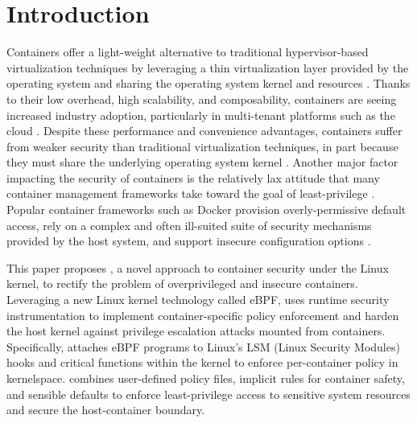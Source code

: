 \section{Introduction}

Containers offer a light-weight alternative to traditional hypervisor-based virtualization techniques by leveraging a thin virtualization layer provided by the operating system and sharing the operating system kernel and resources \cite{sultan2019_container_security,sun2018_security_namespace}. Thanks to their low overhead, high scalability, and composability, containers are seeing increased industry adoption, particularly in multi-tenant platforms such as the cloud \cite{sultan2019_container_security}. Despite these performance and convenience advantages, containers suffer from weaker security than traditional virtualization techniques, in part because they must share the underlying operating system kernel \cite{sultan2019_container_security,sun2018_security_namespace,xin2018_container_security}. Another major factor impacting the security of containers is the relatively lax attitude that many container management frameworks take toward the goal of least-privilege \cite{sultan2019_container_security}. Popular container frameworks such as Docker \cite{docker} provision overly-permissive default access, rely on a complex and often ill-suited suite of security mechanisms provided by the host system, and support insecure configuration options \cite{docker,sultan2019_container_security,xin2018_container_security,findlay2020_bpfbox}.

This paper proposes \bpfcontain{}, a novel approach to container security under the Linux kernel, to rectify the problem of overprivileged and insecure containers. Leveraging a new Linux kernel technology called eBPF, \bpfcontain{} uses runtime security instrumentation to implement container-specific policy enforcement and harden the host kernel against privilege escalation attacks mounted from containers. Specifically, \bpfcontain{} attaches eBPF programs to Linux's LSM (Linux Security Modules) hooks and critical functions within the kernel to enforce per-container policy in kernelspace. \bpfcontain{} combines user-defined policy files, implicit rules for container safety, and sensible defaults to enforce least-privilege access to sensitive system resources and secure the host-container boundary.

